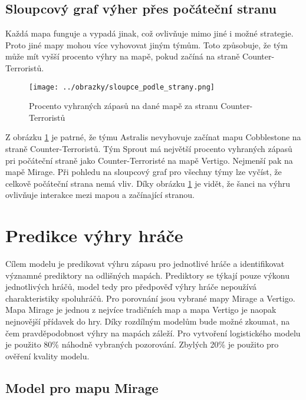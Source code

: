 \newpage
{\color{red}
\subsection{Sloupcový graf výher přes počáteční stranu}
Každá mapa funguje a vypadá jinak, což ovlivňuje mimo jiné i možné strategie. Proto jiné mapy mohou více vyhovovat jiným týmům. Toto způsobuje, že
tým může mít vyšší procento výhry na mapě, pokud začíná na straně Counter-Terroristů.

\begin{figure}[H]
    \centering
    \texttt{[image: ../obrazky/sloupce\_podle\_strany.png]}
    \caption{Procento vyhraných zápasů na dané mapě za stranu Counter-Terroristů} 
    \label{fig:sloupcovy_graf_strany}
\end{figure}

Z obrázku \ref{fig:sloupcovy_graf_strany} je patrné, že týmu Astralis nevyhovuje začínat mapu Cobblestone na straně Counter-Terroristů. Tým Sprout má největší procento
vyhraných zápasů pri počáteční straně jako Counter-Terroristé na mapě Vertigo. Nejmenší pak na mapě Mirage. Při pohledu na sloupcový graf pro všechny týmy lze vyčíst,
že celkově počáteční strana nemá vliv. Díky obrázku \ref{fig:sloupcovy_graf_strany} je vidět, že šanci na výhru ovlivňuje interakce mezi mapou a začínající stranou. 
}

\section{Predikce výhry hráče}
{\color{red}
Cílem modelu je predikovat výhru zápasu pro jednotlivé hráče a identifikovat významné prediktory na odlišných mapách.
}
Prediktory se týkají pouze výkonu jednotlivých hráčů, model tedy pro předpověď výhry hráče nepoužívá charakteristiky spoluhráčů. Pro porovnání jsou vybrané mapy Mirage a Vertigo.
Mapa Mirage je jednou z nejvíce tradičních map a mapa Vertigo je naopak nejnovější přídavek do hry. Díky rozdílným modelům bude možné zkoumat, na čem pravděpodobnost výhry na 
mapách záleží. Pro vytvoření logistického modelu je použito 80\% náhodně vybraných pozorování. Zbylých 20\% je použito pro
{\color{red}
ověření kvality modelu.
}

\subsection{Model pro mapu Mirage}



